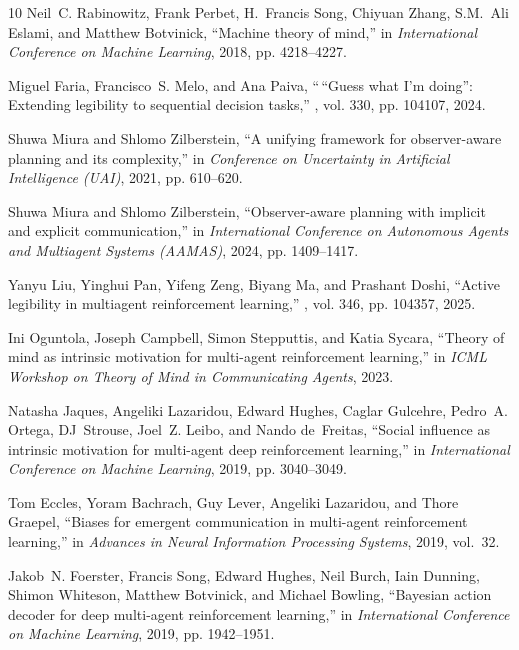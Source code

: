 \documentclass{article}
\begin{document}
\begin{thebibliography}{10}
Neil~C. Rabinowitz, Frank Perbet, H.~Francis Song, Chiyuan Zhang, S.M.~Ali Eslami, and Matthew Botvinick,
\newblock ``Machine theory of mind,''
\newblock in {\em International Conference on Machine Learning}, 2018, pp. 4218--4227.

Miguel Faria, Francisco~S. Melo, and Ana Paiva,
\newblock ``\,``Guess what I'm doing'': Extending legibility to sequential decision tasks,''
, vol. 330, pp. 104107, 2024.

Shuwa Miura and Shlomo Zilberstein,
\newblock ``A unifying framework for observer-aware planning and its complexity,''
\newblock in {\em Conference on Uncertainty in Artificial Intelligence (UAI)}, 2021, pp. 610--620.

Shuwa Miura and Shlomo Zilberstein,
\newblock ``Observer-aware planning with implicit and explicit communication,''
\newblock in {\em International Conference on Autonomous Agents and Multiagent Systems (AAMAS)}, 2024, pp. 1409--1417.

Yanyu Liu, Yinghui Pan, Yifeng Zeng, Biyang Ma, and Prashant Doshi,
\newblock ``Active legibility in multiagent reinforcement learning,''
, vol. 346, pp. 104357, 2025.

Ini Oguntola, Joseph Campbell, Simon Stepputtis, and Katia Sycara,
\newblock ``Theory of mind as intrinsic motivation for multi-agent reinforcement learning,''
\newblock in {\em ICML Workshop on Theory of Mind in Communicating Agents}, 2023.

Natasha Jaques, Angeliki Lazaridou, Edward Hughes, Caglar Gulcehre, Pedro~A. Ortega, DJ~Strouse, Joel~Z. Leibo, and Nando de~Freitas,
\newblock ``Social influence as intrinsic motivation for multi-agent deep reinforcement learning,''
\newblock in {\em International Conference on Machine Learning}, 2019, pp. 3040--3049.

Tom Eccles, Yoram Bachrach, Guy Lever, Angeliki Lazaridou, and Thore Graepel,
\newblock ``Biases for emergent communication in multi-agent reinforcement learning,''
\newblock in {\em Advances in Neural Information Processing Systems}, 2019, vol.~32.

Jakob~N. Foerster, Francis Song, Edward Hughes, Neil Burch, Iain Dunning, Shimon Whiteson, Matthew Botvinick, and Michael Bowling,
\newblock ``Bayesian action decoder for deep multi-agent reinforcement learning,''
\newblock in {\em International Conference on Machine Learning}, 2019, pp. 1942--1951.


\end{thebibliography}
\end{document}
